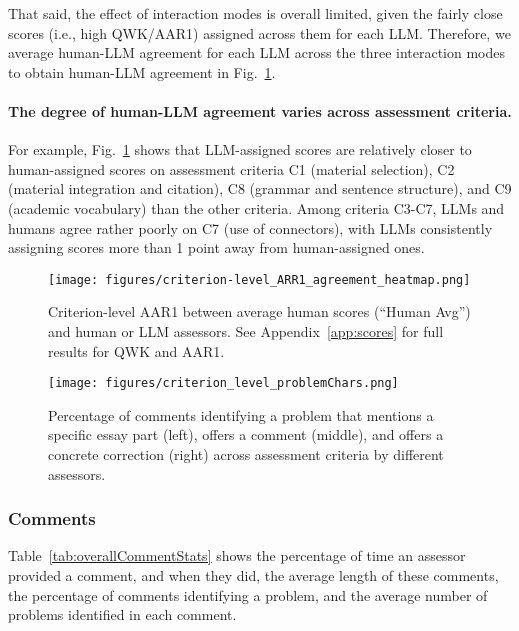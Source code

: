 That said, the effect of interaction modes is overall limited, given the fairly close scores (i.e., high QWK/AAR1) assigned across them for each LLM. Therefore, we average human-LLM agreement for each LLM across the three interaction modes to obtain human-LLM agreement in Fig.~\ref{fig:criterion-level_agreement_heatmap}.


\paragraph{The degree of human-LLM agreement varies across assessment criteria.} For example, Fig.~\ref{fig:criterion-level_agreement_heatmap} shows that LLM-assigned scores are relatively closer to human-assigned scores on assessment criteria C1 (material selection), C2 (material integration and citation), C8 (grammar and sentence structure), and C9 (academic vocabulary) than the other criteria. Among criteria C3-C7, LLMs and humans agree rather poorly on C7 (use of connectors), with LLMs consistently assigning scores more than 1 point away from human-assigned ones.



\begin{figure}
    \centering
    \small
    \texttt{[image: figures/criterion-level\_ARR1\_agreement\_heatmap.png]}
    \caption{Criterion-level AAR1 between average human scores (``Human Avg'') and human or LLM assessors. See Appendix~\ref{app:scores} for full results for QWK and AAR1.}
    \label{fig:criterion-level_agreement_heatmap}
\end{figure}




\begin{figure*}
    \centering
    \small
    \texttt{[image: figures/criterion\_level\_problemChars.png]}
    \caption{Percentage of comments identifying a problem that mentions a specific essay part (left), offers a comment (middle), and offers a concrete correction (right) across assessment criteria by different assessors.}
    \label{fig:criterion_level_problemChars}
\end{figure*}


\subsubsection{Comments}

Table~\ref{tab:overallCommentStats} shows the percentage of time an assessor provided a comment, and when they did, the average length of these comments, the percentage of comments identifying a problem, and the average number of problems identified in each comment. 

